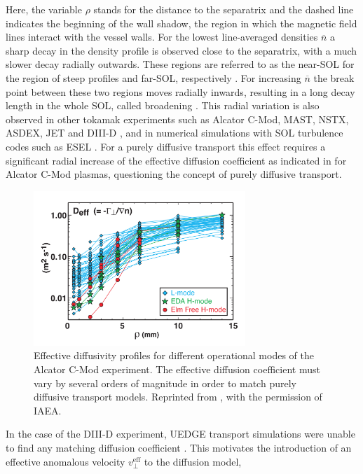 Here, the variable $\rho$ stands for the distance to the separatrix and the dashed line indicates the beginning of the wall shadow, the region in which the magnetic field lines interact with the vessel walls. For the lowest line-averaged densities $\overline{n}$ a sharp decay in the density profile is observed close to the separatrix, with a much slower decay radially outwards. These regions are referred to as the near-SOL for the region of steep profiles and far-SOL, respectively \cite{labombard2001particle}. For increasing $\overline{n}$ the break point between these two regions moves radially inwards, resulting in a long decay length in the whole SOL, called broadening \cite{militello2016scrape}. This radial variation is also observed in other tokamak experiments such as Alcator C-Mod, MAST, NSTX, ASDEX, JET and DIII-D \cite{umansky1999modeling,rudakov2005far,militello2013experimental,boedo2014edge,carralero2014experimental,stangeby2000plasma,lipschultz2005comparison}, and in numerical simulations with SOL turbulence codes such as ESEL \cite{naulin2007turbulent}. For a purely diffusive transport this effect requires a significant radial increase of the effective diffusion coefficient as indicated in  for Alcator C-Mod plasmas, questioning the concept of purely diffusive transport.
\begin{figure}[t]
	\centering
	\includegraphics[width=8cm]{figures/effective_diff.png}
	\caption{Effective diffusivity profiles for different operational modes of the Alcator C-Mod experiment. The effective diffusion coefficient must vary by several orders of magnitude in order to match purely diffusive transport models. Reprinted from \cite{labombard2000cross}, with the permission of IAEA.}
	\label{Fig:labombard}
\end{figure}
In the case of the DIII-D experiment, UEDGE transport simulations were unable to find any matching diffusion coefficient \cite{pigarov2002tokamak}. This motivates the introduction of an effective anomalous velocity $v_\perp^\textrm{eff}$ to the diffusion model,
